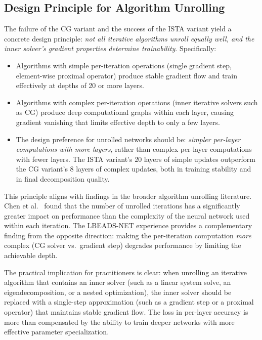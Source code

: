 \subsection{Design Principle for Algorithm Unrolling}
\label{sec:disc_cg_principle}

The failure of the CG variant and the success of the ISTA variant yield a concrete design principle: \emph{not all iterative algorithms unroll equally well, and the inner solver's gradient properties determine trainability}. Specifically:

\begin{itemize}
    \item Algorithms with simple per-iteration operations (single gradient step, element-wise proximal operator) produce stable gradient flow and train effectively at depths of 20 or more layers.

    \item Algorithms with complex per-iteration operations (inner iterative solvers such as CG) produce deep computational graphs within each layer, causing gradient vanishing that limits effective depth to only a few layers.

    \item The design preference for unrolled networks should be: \emph{simpler per-layer computations with more layers}, rather than complex per-layer computations with fewer layers. The ISTA variant's 20 layers of simple updates outperform the CG variant's 8 layers of complex updates, both in training stability and in final decomposition quality.
\end{itemize}

This principle aligns with findings in the broader algorithm unrolling literature. Chen et al.~\cite{chen2025demun} found that the number of unrolled iterations has a significantly greater impact on performance than the complexity of the neural network used within each iteration. The LBEADS-NET experience provides a complementary finding from the opposite direction: making the per-iteration computation \emph{more} complex (CG solver vs.\ gradient step) degrades performance by limiting the achievable depth.

The practical implication for practitioners is clear: when unrolling an iterative algorithm that contains an inner solver (such as a linear system solve, an eigendecomposition, or a nested optimization), the inner solver should be replaced with a single-step approximation (such as a gradient step or a proximal operator) that maintains stable gradient flow. The loss in per-layer accuracy is more than compensated by the ability to train deeper networks with more effective parameter specialization.


